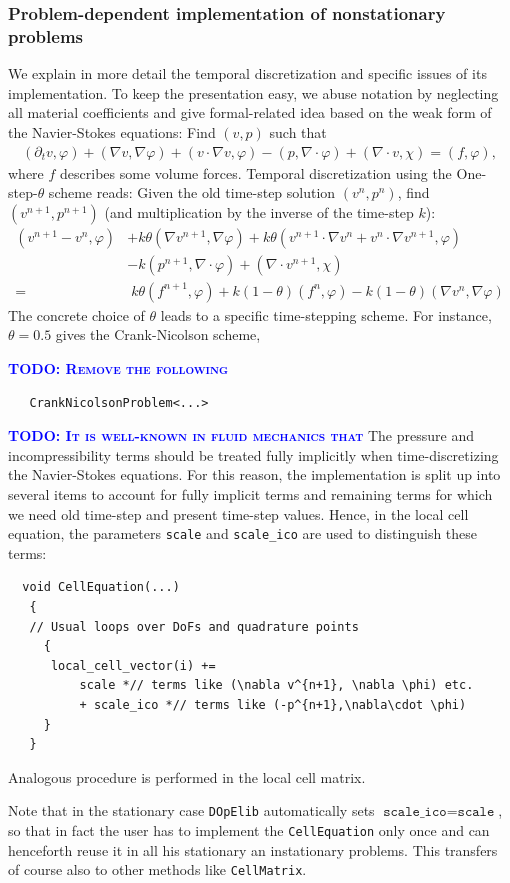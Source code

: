 \documentclass[prodmode,acmtoms]{acmsmall}
\numberwithin{equation}{section}
\renewcommand{\phi}{\varphi}
\newcommand{\dope}{\texttt{DOpElib}}
\newcommand{\todo}[1]{\textbf{\textsc{\textcolor{blue}{TODO: #1}}}}
\begin{document}
\subsubsection{Problem-dependent 
implementation of nonstationary problems}
\label{sec:timedep:implementation}
We explain in more detail the temporal discretization
and specific issues of its implementation. 
To keep the presentation easy, we abuse notation 
by neglecting
all material coefficients
and give formal-related idea based on the weak 
form of the Navier-Stokes equations:
Find $(v,p)$ such that
\begin{align*}
(\partial_t v,\phi) 
+ (\nabla v, \nabla \phi)
+ (v\cdot\nabla v,\phi)
-(p,\nabla\cdot \phi)
+(\nabla\cdot v, \chi)
=(f,\phi),
\end{align*}
where $f$ describes some volume forces.
Temporal discretization using the One-step-$\theta$ scheme reads:
Given the old time-step solution $(v^n,p^n)$, 
find $(v^{n+1}, p^{n+1})$ (and multiplication 
by the inverse of the time-step $k$):
\begin{align*}
(v^{n+1} - v^{n}, \phi)
&+ k\theta (\nabla v^{n+1}, \nabla \phi)
+ k\theta (v^{n+1}\cdot\nabla v^n + 
  v^{n}\cdot\nabla v^{n+1},\phi)\\
&- k (p^{n+1},\nabla\cdot \phi)
+ (\nabla\cdot v^{n+1}, \chi)\\
=&\; k\theta (f^{n+1},\phi) + k(1-\theta) (f^{n},\phi)
- k(1-\theta) (\nabla v^{n}, \nabla \phi) 
\end{align*}
The concrete choice of $\theta$ leads to a
specific time-stepping scheme. For instance,
$\theta = 0.5$ gives the Crank-Nicolson scheme,

\todo{Remove the following}
\begin{lstlisting}
   CrankNicolsonProblem<...>
\end{lstlisting}

\todo{It is well-known in fluid mechanics that}
The pressure and incompressibility terms should be 
treated fully implicitly when time-discretizing 
the Navier-Stokes equations.
For this reason, the implementation is split up
into several items to account for fully implicit 
terms and remaining terms for which we need 
old time-step and present time-step values. 
Hence, in the local cell equation, the parameters
\texttt{scale} and \texttt{scale\_ico}
are used to distinguish these terms:
\begin{lstlisting}
  void CellEquation(...)
   {
   // Usual loops over DoFs and quadrature points
     {
      local_cell_vector(i) +=  
          scale *// terms like (\nabla v^{n+1}, \nabla \phi) etc.
          + scale_ico *// terms like (-p^{n+1},\nabla\cdot \phi)
     }
   }
\end{lstlisting}
Analogous procedure is performed in the local 
cell matrix.
\begin{remark}
Note that in the stationary case \dope{} automatically sets $ \texttt{scale\_ico} = \texttt{scale}$, so that in fact the user has to implement the \texttt{CellEquation} only once and can henceforth reuse it in all his stationary an instationary problems. This transfers of course also to other methods like \texttt{CellMatrix}.
\end{remark}
\end{document}
